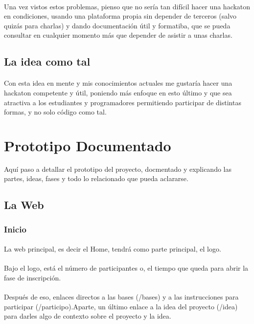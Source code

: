 \documentclass[a4paper]{article}
\begin{document}
    \paragraph{}
    Una vez vistos estos problemas, pienso que no sería tan difícil hacer una hackaton
    en condiciones, usando una plataforma propia sin depender de terceros (salvo quizás 
    para charlas) y dando documentación útil y formatiba, que se pueda consultar en 
    cualquier momento más que depender de asistir a unas charlas.
    \subsection[La Idea]{La idea como tal}
    \paragraph{}
    Con esta idea en mente y mis conocimientos actuales me gustaría hacer 
    una hackaton competente y útil, poniendo más enfoque en esto último y que 
    sea atractiva a los estudiantes y programadores permitiendo participar de 
    distintas formas, y no solo código como tal.

    \section[Prototipo]{Prototipo Documentado}
    Aquí paso a detallar el prototipo del proyecto, docmentado y explicando las partes, 
    ideas, fases y todo lo relacionado que pueda aclararse.
    \subsection[Web]{La Web}
    \subsubsection[/]{Inicio}
    \paragraph{}
    La web principal, es decir el Home, tendrá como parte principal, el logo.
    \paragraph{}
    Bajo el logo, está el número de participantes o, el tiempo que queda para abrir 
    la fase de inscripción.
    \paragraph{}
    Después de eso, enlaces directos a las bases (/bases) y a las instrucciones para 
    participar (/participo).Aparte, un último enlace a la idea del proyecto (/idea) 
    para darles algo de contexto sobre el proyecto y la idea.
\end{document}
